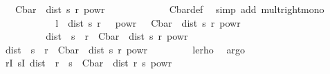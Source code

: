 \begin{isabellebody}
\ {\isachardoublequoteopen}{\isachardot}{\kern0pt}{\isachardot}{\kern0pt}{\isachardot}{\kern0pt}\ {\isasymle}\ C{\isacharunderscore}{\kern0pt}bar\ {\isacharasterisk}{\kern0pt}\ dist\ s\ r\ powr\ {\isasymgamma}{\isachardoublequoteclose}\isanewline
\ \ \ \ \ \ \ \ \ \ \isamarkupfalse%
\ C{\isacharunderscore}{\kern0pt}bar{\isacharunderscore}{\kern0pt}def\ \isamarkupfalse%
\ {\isacharparenleft}{\kern0pt}simp\ add{\isacharcolon}{\kern0pt}\ mult{\isacharunderscore}{\kern0pt}right{\isacharunderscore}{\kern0pt}mono{\isacharparenright}{\kern0pt}\isanewline
\ \ \ \ \ \ \ \ \isamarkupfalse%
\ \isamarkupfalse%
\ {\isachardoublequoteopen}l\ {\isacharasterisk}{\kern0pt}\ {\isacharparenleft}{\kern0pt}dist\ s\ r\ {\isacharslash}{\kern0pt}\ {\isasymrho}{\isacharparenright}{\kern0pt}\ powr\ {\isasymgamma}\ {\isasymle}\ C{\isacharunderscore}{\kern0pt}bar\ {\isacharasterisk}{\kern0pt}\ dist\ s\ r\ powr\ {\isasymgamma}{\isachardoublequoteclose}\isanewline
\ \ \ \ \ \ \ \ \ \ \isacommand{{\isachardot}{\kern0pt}}\isamarkupfalse%
\isanewline
\ \ \ \ \ \ \isamarkupfalse%
\isanewline
\ \ \ \ \ \ \isamarkupfalse%
\ \isamarkupfalse%
\ {\isachardoublequoteopen}dist\ {\isacharparenleft}{\kern0pt}{\isasymphi}\ s{\isacharparenright}{\kern0pt}\ {\isacharparenleft}{\kern0pt}{\isasymphi}\ r{\isacharparenright}{\kern0pt}\ {\isasymle}\ C{\isacharunderscore}{\kern0pt}bar\ {\isacharasterisk}{\kern0pt}\ dist\ s\ r\ powr\ {\isasymgamma}{\isachardoublequoteclose}\isanewline
\ \ \ \ \ \ \ \ \isacommand{{\isachardot}{\kern0pt}}\isamarkupfalse%
\isanewline
\ \ \ \ \isacommand{{\isacharbraceright}{\kern0pt}}\isamarkupfalse%
\isanewline
\ \ \ \ \isamarkupfalse%
\ \isamarkupfalse%
\ {\isachardoublequoteopen}dist\ {\isacharparenleft}{\kern0pt}{\isasymphi}\ s{\isacharparenright}{\kern0pt}\ {\isacharparenleft}{\kern0pt}{\isasymphi}\ r{\isacharparenright}{\kern0pt}\ {\isasymle}\ C{\isacharunderscore}{\kern0pt}bar\ {\isacharasterisk}{\kern0pt}\ dist\ s\ r\ powr\ {\isasymgamma}{\isachardoublequoteclose}\isanewline
\ \ \ \ \ \ \isamarkupfalse%
\ le{\isacharunderscore}{\kern0pt}rho\ \isamarkupfalse%
\ argo\isanewline
\ \ \isacommand{{\isacharbraceright}{\kern0pt}}\isamarkupfalse%
\isanewline
\ \ \isamarkupfalse%
\ \isamarkupfalse%
\ {\isachardoublequoteopen}{\isasymforall}r{\isasymin}I{\isachardot}{\kern0pt}\ {\isasymforall}s{\isasymin}I{\isachardot}{\kern0pt}\ dist\ {\isacharparenleft}{\kern0pt}{\isasymphi}\ r{\isacharparenright}{\kern0pt}\ {\isacharparenleft}{\kern0pt}{\isasymphi}\ s{\isacharparenright}{\kern0pt}\ {\isasymle}\ C{\isacharunderscore}{\kern0pt}bar\ {\isacharasterisk}{\kern0pt}\ dist\ r\ s\ powr\ {\isasymgamma}{\isachardoublequoteclose}\isanewline

\end{isabellebody}
